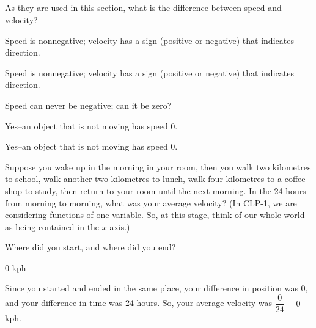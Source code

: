 %
%

\subsection*{\Conceptual}

\begin{question}
As they are used in this section, what is the difference between speed and velocity?
\end{question}
\begin{answer}
Speed is nonnegative; velocity has a sign (positive or negative) that indicates direction.
\end{answer}
\begin{solution}
Speed is nonnegative; velocity has a sign (positive or negative) that indicates direction.
\end{solution}

\begin{question} Speed can never be negative; can it be zero?
\end{question}
\begin{answer}
Yes--an object that is not moving has speed 0.
\end{answer}
\begin{solution}
Yes--an object that is not moving has speed 0.
\end{solution}


\begin{Mquestion}Suppose you wake up in the morning in your room, then you walk two kilometres to school, walk another two kilometres to lunch, walk four kilometres to a coffee shop to study, then return to your room until the next morning. In the 24 hours from morning to morning, what was your average velocity? (In CLP-1, we are considering functions of one variable. So, at this stage, think of our whole world as being contained in the $x$-axis.)
\end{Mquestion}
\begin{hint}Where did you start, and where did you end?
\end{hint}
\begin{answer}0 kph
\end{answer}
\begin{solution}Since you started and ended in the same place, your difference in position was 0, and  your difference in time was 24 hours. So, your average velocity was $\dfrac{0}{24}=0$ kph.
\end{solution}



